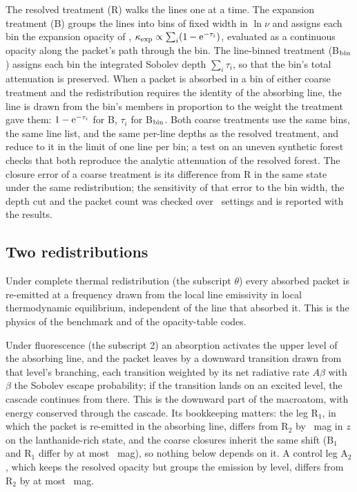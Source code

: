 \documentclass[fleqn,usenatbib]{mnras}
\newcommand{\Rres}{R\xspace}
\newcommand{\Bexp}{B\xspace}
\newcommand{\Bbin}{B$_{\rm bin}$\xspace}
\newcommand{\Rtwo}{R$_2$\xspace}
\newcommand{\Atwo}{A$_2$\xspace}
\newcommand{\Rone}{R$_1$\xspace}
\newcommand{\Bone}{B$_1$\xspace}
\begin{document}
The resolved treatment (\Rres) walks the lines one at a time. The expansion treatment (\Bexp) groups the lines into bins of fixed width in $\ln\nu$ and assigns each bin the expansion opacity of \citet{eastman1993}, $\kappa_{\rm exp}\propto\sum_i(1-{\rm e}^{-\tau_i})$, evaluated as a continuous opacity along the packet's path through the bin. The line-binned treatment (\Bbin) assigns each bin the integrated Sobolev depth $\sum_i\tau_i$, so that the bin's total attenuation is preserved. When a packet is absorbed in a bin of either coarse treatment and the redistribution requires the identity of the absorbing line, the line is drawn from the bin's members in proportion to the weight the treatment gave them: $1-{\rm e}^{-\tau_i}$ for \Bexp, $\tau_i$ for \Bbin. Both coarse treatments use the same bins, the same line list, and the same per-line depths as the resolved treatment, and reduce to it in the limit of one line per bin; a test on an uneven synthetic forest checks that both reproduce the analytic attenuation of the resolved forest. The closure error of a coarse treatment is its difference from \Rres in the same state under the same redistribution; the sensitivity of that error to the bin width, the depth cut and the packet count was checked over \ConvNsettings\ settings and is reported with the results.

\subsection{Two redistributions}

Under complete thermal redistribution (the subscript $\theta$) every absorbed packet is re-emitted at a frequency drawn from the local line emissivity in local thermodynamic equilibrium, independent of the line that absorbed it. This is the physics of the \citet{fontes2020} benchmark and of the opacity-table codes.

Under fluorescence (the subscript 2) an absorption activates the upper level of the absorbing line, and the packet leaves by a downward transition drawn from that level's branching, each transition weighted by its net radiative rate $A\beta$ with $\beta$ the Sobolev escape probability; if the transition lands on an excited level, the cascade continues from there. This is the downward part of the \citet{lucy2002} macroatom, with energy conserved through the cascade. Its bookkeeping matters: the leg \Rone, in which the packet is re-emitted in the absorbing line, differs from \Rtwo by \RoneRtwoZ\ mag in $z$ on the lanthanide-rich state, and the coarse closures inherit the same shift (\Bone and \Rone differ by at most \BoneRoneAbsmax\ mag), so nothing below depends on it. A control leg \Atwo, which keeps the resolved opacity but groups the emission by level, differs from \Rtwo by at most \AtwoRtwoAbsmax\ mag.
\end{document}
